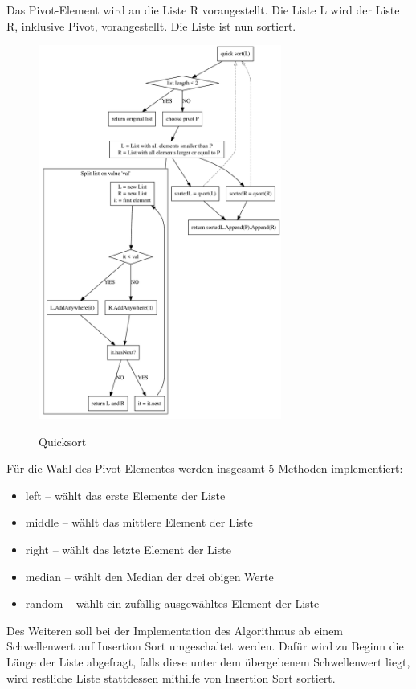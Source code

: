 \documentclass[11pt]{article}
\begin{document}
    Das Pivot-Element wird an die Liste R vorangestellt.
    Die Liste L wird der Liste R, inklusive Pivot, vorangestellt.
    Die Liste ist nun sortiert.\\

    \begin{figure}[hbt]
        \caption{Quicksort}
        \centering
        \includegraphics[width = 8cm]{qsort.pdf}\label{fig:qsort}
    \end{figure}

    Für die Wahl des Pivot-Elementes werden insgesamt 5 Methoden implementiert:
    \begin{itemize}
        \item left -- wählt das erste Elemente der Liste
        \item middle -- wählt das mittlere Element der Liste
        \item right -- wählt das letzte Element der Liste
        \item median -- wählt den Median der drei obigen Werte
        \item random -- wählt ein zufällig ausgewähltes Element der Liste
    \end{itemize}

    Des Weiteren soll bei der Implementation des Algorithmus ab einem
    Schwellenwert auf Insertion Sort umgeschaltet werden.
    Dafür wird zu Beginn die Länge der Liste abgefragt, falls diese unter dem
    übergebenem Schwellenwert liegt, wird restliche Liste stattdessen
    mithilfe von Insertion Sort sortiert.
\end{document}
